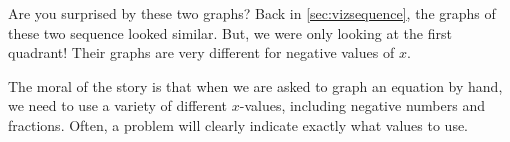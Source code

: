 Are you surprised by these two graphs? Back in \cref{sec:vizsequence}, the graphs of these two sequence looked similar. But, we were only looking at the first quadrant! Their graphs are very different for negative values of $x$.

The moral of the story is that when we are asked to graph an equation by hand, we need to use a variety of different $x$-values, including negative numbers and fractions. Often, a problem will clearly indicate exactly what values to use.

\begin{boxedexplore}
\end{boxedexplore}


